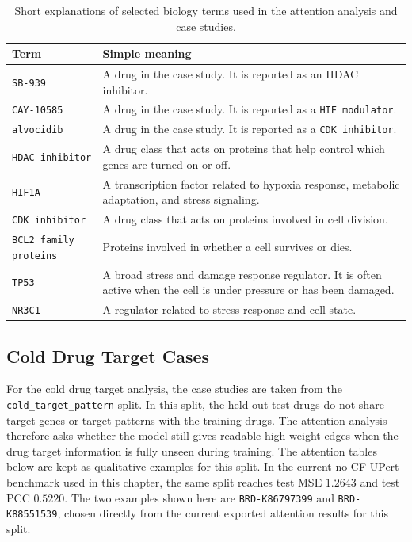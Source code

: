 \begin{table}[htbp]
\centering
\caption[Biology Terms for Case Studies]{Short explanations of selected biology terms used in the attention analysis and case studies.}
\label{tab:case_study_terms}
\begin{tabular}{p{3.0cm}p{10.0cm}}
\hline
Term & Simple meaning \\
\hline
\texttt{SB-939} & A drug in the case study. It is reported as an HDAC inhibitor. \\
\texttt{CAY-10585} & A drug in the case study. It is reported as a \texttt{HIF modulator}. \\
\texttt{alvocidib} & A drug in the case study. It is reported as a \texttt{CDK inhibitor}. \\
\texttt{HDAC inhibitor} & A drug class that acts on proteins that help control which genes are turned on or off. \\
\texttt{HIF1A} & A transcription factor related to hypoxia response, metabolic adaptation, and stress signaling. \\
\texttt{CDK inhibitor} & A drug class that acts on proteins involved in cell division. \\
\texttt{BCL2 family proteins} & Proteins involved in whether a cell survives or dies. \\
\texttt{TP53} & A broad stress and damage response regulator. It is often active when the cell is under pressure or has been damaged. \\
\texttt{NR3C1} & A regulator related to stress response and cell state. \\
\hline
\end{tabular}
\end{table}

\subsection*{Cold Drug Target Cases}
\noindent For the cold drug target analysis, the case studies are taken from the \texttt{cold\_target\_pattern} split. In this split, the held out test drugs do not share target genes or target patterns with the training drugs. The attention analysis therefore asks whether the model still gives readable high weight edges when the drug target information is fully unseen during training. The attention tables below are kept as qualitative examples for this split. In the current no-CF UPert benchmark used in this chapter, the same split reaches test MSE $1.2643$ and test PCC $0.5220$. The two examples shown here are \texttt{BRD-K86797399} and \texttt{BRD-K88551539}, chosen directly from the current exported attention results for this split.

